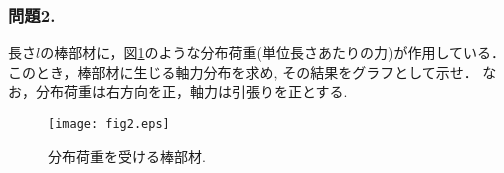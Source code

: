 \documentclass[10pt,a4j]{jarticle}
\begin{document}
\subsubsection*{問題2.} 
長さ$l$の棒部材に，図\ref{fig:fig2}のような分布荷重(単位長さあたりの力)が作用している．
このとき，棒部材に生じる軸力分布を求め, その結果をグラフとして示せ．
なお，分布荷重は右方向を正，軸力は引張りを正とする.
\begin{figure}[h]
	\begin{center}
	\texttt{[image: fig2.eps]} 
	\end{center}
	\vspace{-5mm}
	\caption{分布荷重を受ける棒部材.} 
	\label{fig:fig2}
\end{figure}
\end{document}
